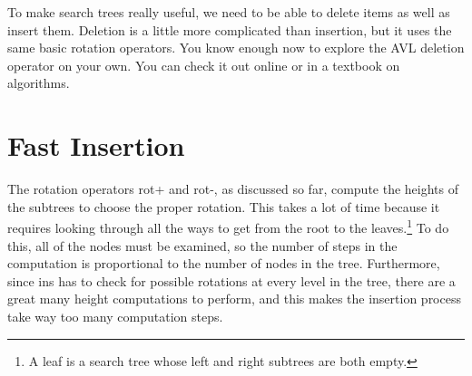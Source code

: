 To make search trees really useful, we need to be able to delete items
as well as insert them.
Deletion is a little more complicated than
insertion, but it uses the same basic rotation operators.
You know enough now to explore the AVL deletion operator on your own.
You can check it out online or in a textbook on algorithms.

\begin{exercises}




\end{exercises}

\section{Fast Insertion}

The rotation operators \textsf{rot}+ and \textsf{rot-}, as discussed so far,
compute the heights of the subtrees to choose the proper rotation.
This takes a lot of time because it requires
looking through all the ways to get from the root to the leaves.\footnote{A
leaf is a search tree whose left and right subtrees are both empty.}
To do this, all of the nodes must be examined, so the number of steps in
the computation is proportional to the number of nodes in the tree.
Furthermore, since \textsf{ins} has to check
for possible rotations at every level in the
tree, there are a great many height computations to perform, and this
makes the insertion process take way too many computation steps.

